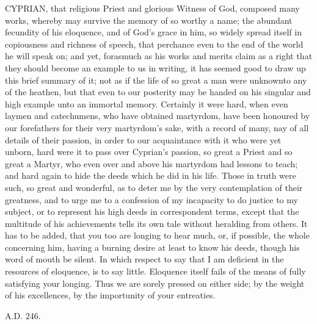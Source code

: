 
CYPRIAN, that
religious Priest and glorious Witness of God, composed many works,
whereby may survive the memory of so worthy a name; the abundant
fecundity of his eloquence, and of God's grace in him, so widely
spread itself in copiousness and richness of speech, that perchance
even to the end of the world he will speak on; and yet, forasmuch as
his works and merits claim as a right that they should become an
example to us in writing, it has seemed good to draw up this brief
summary of it; not as if the life of so great a man were unknown\emph{}to
any of the heathen, but that even to our posterity may be handed on
his singular and high example unto an immortal memory. Certainly it
were hard, when even laymen and catechumens, who have obtained
martyrdom, have been honoured by our forefathers for their very
martyrdom's sake, with a record of many, nay of all details of their
passion, in order to our acquaintance with it who were yet unborn,
hard were it to pass over Cyprian's passion, so great a Priest and so
great a Martyr, who even over and above his martyrdom had lessons to
teach; and hard again to hide the deeds which he did in his life.
Those in truth were such, so great and wonderful, as to deter me by
the very contemplation of their greatness, and to urge me to a
confession of my incapacity to do justice to my subject, or to
represent his high deeds in correspondent terms, except that the
multitude of his achievements tells its own tale without heralding
from others. It has to be added, that you too are longing to hear
much, or, if possible, the whole concerning him, having a burning
desire at least to know his deeds, though his word of mouth be silent.
In which respect to say that I am deficient in the resources of eloquence, is to say little. Eloquence itself fails of the means of
fully satisfying your longing. Thus we are sorely pressed on either
side; by the weight of his excellences, by the importunity of your
entreaties.

A.D. 246.

